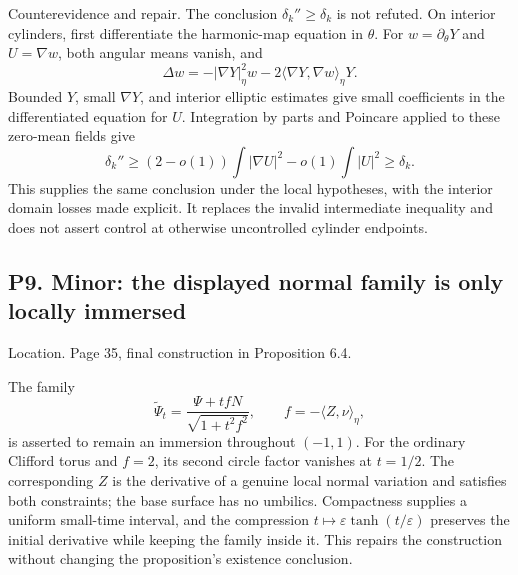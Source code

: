 \documentclass[10pt]{article}
\begin{document}
Counterevidence and repair. The conclusion \(\delta_k''\ge\delta_k\) is not refuted. On interior cylinders, first differentiate the harmonic-map equation in \(\theta\). For \(w=\partial_\theta Y\) and \(U=\nabla w\), both angular means vanish, and \[\Delta w=-|\nabla Y|_\eta^2w
                  -2\langle \nabla Y,\nabla w\rangle_\eta Y.\] Bounded \(Y\), small \(\nabla Y\), and interior elliptic estimates give small coefficients in the differentiated equation for \(U\). Integration by parts and Poincare applied to these zero-mean fields give \[\delta_k''\ge(2-o(1))\int|\nabla U|^2-o(1)\int|U|^2
                 \ge\delta_k .\] This supplies the same conclusion under the local hypotheses, with the interior domain losses made explicit. It replaces the invalid intermediate inequality and does not assert control at otherwise uncontrolled cylinder endpoints.\par
\subsection*{P9. Minor: the displayed normal family is only locally immersed}
Location. Page 35, final construction in Proposition 6.4.\par
The family \[\widetilde\Psi_t=\frac{\Psi+t fN}{\sqrt{1+t^2f^2}},
 \qquad f=-\langle Z,\nu \rangle_\eta,\] is asserted to remain an immersion throughout \((-1,1)\). For the ordinary Clifford torus and \(f=2\), its second circle factor vanishes at \(t=1/2\). The corresponding \(Z\) is the derivative of a genuine local normal variation and satisfies both constraints; the base surface has no umbilics. Compactness supplies a uniform small-time interval, and the compression \(t\mapsto\varepsilon\tanh(t/\varepsilon)\) preserves the initial derivative while keeping the family inside it. This repairs the construction without changing the proposition’s existence conclusion.\par
\end{document}
